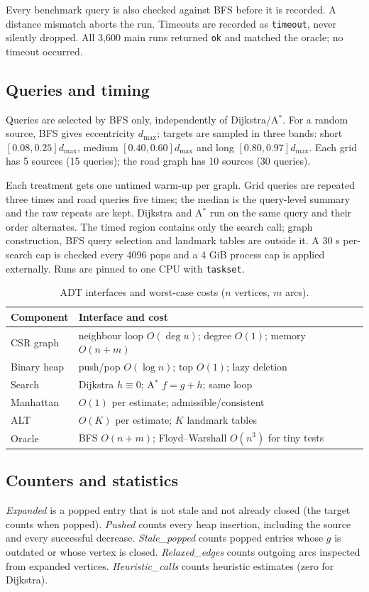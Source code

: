 \documentclass[conference,10pt]{IEEEtran}
\newcommand{\Astar}{A$^\ast$}
\newcommand{\code}[1]{\texttt{#1}}
\begin{document}
Every benchmark query is also checked against BFS before it is recorded.  A
distance mismatch aborts the run.  Timeouts are recorded as \code{timeout},
never silently dropped.  All 3,600 main runs returned \code{ok} and matched the
oracle; no timeout occurred.

\subsection{Queries and timing}
Queries are selected by BFS only, independently of Dijkstra/\Astar{}.  For a
random source, BFS gives eccentricity $d_{\max}$; targets are sampled in three
bands: short $[0.08,0.25]d_{\max}$, medium $[0.40,0.60]d_{\max}$ and long
$[0.80,0.97]d_{\max}$.  Each grid has 5 sources (15 queries); the road graph has
10 sources (30 queries).

Each treatment gets one untimed warm-up per graph.  Grid queries are repeated
three times and road queries five times; the median is the query-level summary
and the raw repeats are kept.  Dijkstra and \Astar{} run on the same query and
their order alternates.  The timed region contains only the search call;
graph construction, BFS query selection and landmark tables are outside it.
A 30 s per-search cap is checked every 4096 pops and a 4 GiB process cap is
applied externally.  Runs are pinned to one CPU with \code{taskset}.

\begin{table}[!t]
\centering
\caption{ADT interfaces and worst-case costs ($n$ vertices, $m$ arcs).}
\label{tab:adt}
\footnotesize
\setlength{\tabcolsep}{3pt}
\begin{tabular}{p{2.6cm}p{3.7cm}}
\toprule
Component & Interface and cost\\
\midrule
CSR graph & neighbour loop $O(\deg u)$; degree $O(1)$; memory $O(n+m)$\\
Binary heap & push/pop $O(\log n)$; top $O(1)$; lazy deletion\\
Search & Dijkstra $h\equiv0$; \Astar{} $f=g+h$; same loop\\
Manhattan & $O(1)$ per estimate; admissible/consistent\\
ALT & $O(K)$ per estimate; $K$ landmark tables\\
Oracle & BFS $O(n+m)$; Floyd--Warshall $O(n^3)$ for tiny tests\\
\bottomrule
\end{tabular}
\end{table}

\subsection{Counters and statistics}
\emph{Expanded} is a popped entry that is not stale and not already closed
(the target counts when popped).  \emph{Pushed} counts every heap insertion,
including the source and every successful decrease.  \emph{Stale\_popped}
counts popped entries whose $g$ is outdated or whose vertex is closed.
\emph{Relaxed\_edges} counts outgoing arcs inspected from expanded vertices.
\emph{Heuristic\_calls} counts heuristic estimates (zero for Dijkstra).
\end{document}
